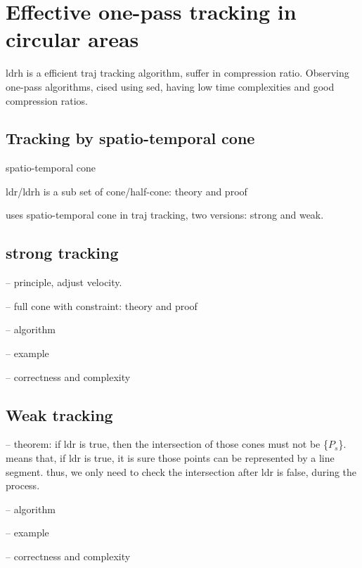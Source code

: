 \section{Effective one-pass tracking in circular areas}
\label{sec:circular}

ldrh is a efficient traj tracking algorithm, suffer in compression ratio.
Observing one-pass algorithms, cised using sed, having
low time complexities and good compression ratios.

\subsection{Tracking by spatio-temporal cone}

spatio-temporal cone

ldr/ldrh is a sub set of cone/half-cone: theory and proof

uses spatio-temporal cone in traj tracking, two versions: strong and weak.

\subsection{strong tracking}

-- principle, adjust velocity.

-- full cone with constraint: theory and proof

-- algorithm

-- example

-- correctness and complexity

\subsection{Weak tracking}

-- theorem: if ldr is true, then the intersection of those cones must not be \{$P_s$\}.
means that, if ldr is true, it is sure those points can be represented by a line segment.
thus, we only need to check the intersection after ldr is false, during the process.

-- algorithm

-- example

-- correctness and complexity


